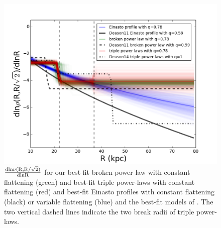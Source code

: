 \documentclass[12pt,preprint]{aastex}
\begin{document}
\begin{figure}[htbp]
\centering
\includegraphics[width=\textwidth]{combinexueanddeason}
\caption{$\rm \frac{dln\nu(R,R/\sqrt{2})}{dlnR}$ for our best-fit broken power-law with constant flattening (green) and best-fit triple power-laws with constant flattening (red) and best-fit Einasto profiles with constant flattening (black) or variable flattening (blue) and the best-fit models of \citet[black]{Deason2011,Deason2014}. The two vertical dashed lines indicate the two break radii of triple power-laws.}
\label{f:fdensitycompare}
\end{figure}
\end{document}

